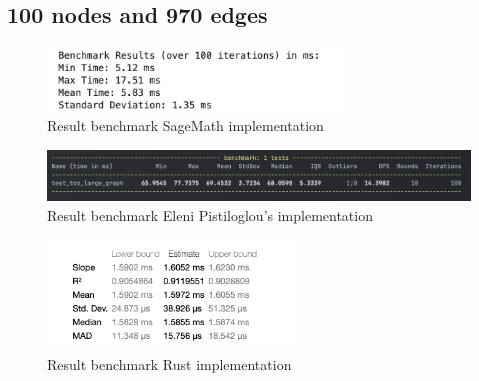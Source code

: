\newpage


\subsection{100 nodes and 970 edges}\label{subsec:result-for-graphs-100-970}

\begin{figure}[!h]
    \centering
    \includegraphics[width=0.70\textwidth]{images/benchmark/graph_100_970/benchmark_graph_100_970_sagemath}
    \caption{Result benchmark SageMath implementation}
    \label{fig:benchmark-graph-100-970-sagemath}
\end{figure}

\begin{figure}[!h]
    \centering
    \includegraphics[width=1\textwidth]{images/benchmark/graph_100_970/benchmark_graph_100_970_python}
    \caption{Result benchmark Eleni Pistiloglou's implementation}
    \label{fig:benchmark-graph-100-970-python}
\end{figure}

\begin{figure}[!h]
    \centering
    \includegraphics[width=0.60\textwidth]{images/benchmark/graph_100_970/benchmark_graph_100_970_rust}
    \caption{Result benchmark Rust implementation}
    \label{fig:benchmark-graph-100-970-rust}
\end{figure}

